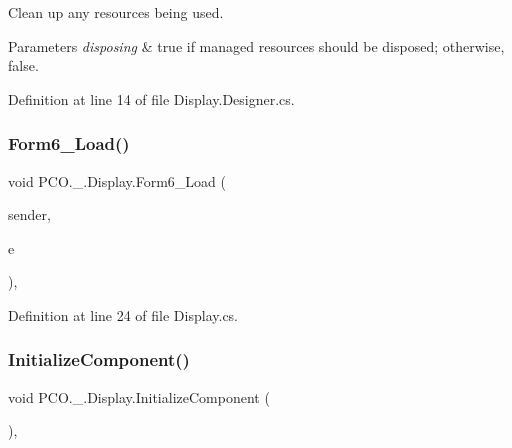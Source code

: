 Clean up any resources being used. 


\begin{DoxyParams}{Parameters}
{\em disposing} & true if managed resources should be disposed; otherwise, false.\\
\hline
\end{DoxyParams}


Definition at line 14 of file Display.\+Designer.\+cs.

\mbox{\label{classPCO_1_1__0_1_1Display_aa37caaa188d791b95b8d79dc1bbc953e}} 
\subsubsection{\texorpdfstring{Form6\+\_\+\+Load()}{Form6\_Load()}}
{\footnotesize\ttfamily void P\+C\+O.\+\_.\+Display.\+Form6\+\_\+\+Load (\begin{DoxyParamCaption}\item[{object}]{sender,  }\item[{Event\+Args}]{e }\end{DoxyParamCaption})\hspace{0.3cm}{\ttfamily [inline]}, {\ttfamily [private]}}



Definition at line 24 of file Display.\+cs.

\mbox{\label{classPCO_1_1__0_1_1Display_a4c56052f9f51cbdff10fcb1a4d55f750}} 
\subsubsection{\texorpdfstring{Initialize\+Component()}{InitializeComponent()}}
{\footnotesize\ttfamily void P\+C\+O.\+\_.\+Display.\+Initialize\+Component (\begin{DoxyParamCaption}{ }\end{DoxyParamCaption})\hspace{0.3cm}{\ttfamily [inline]}, {\ttfamily [private]}}



